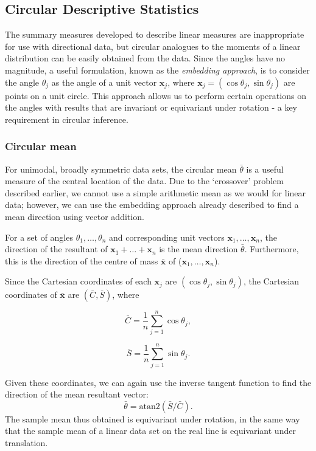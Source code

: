 \documentclass[../../ArchStats.tex]{subfiles}
\begin{document}
\subsection{Circular Descriptive Statistics}

The summary measures developed to describe linear measures are inappropriate for use with directional data, but circular analogues to the moments of a linear distribution can be easily obtained from the data. Since the angles have no magnitude, a useful formulation, known as the \textit{embedding approach}, is to consider the angle $\theta_j$ as the angle of a unit vector $\mathbf{x}_j$, where $\mathbf{x}_j = (\cos\theta_j, \sin\theta_j)$ are points on a unit circle. This approach allows us to perform certain operations on the angles with results that are invariant or equivariant under rotation - a key requirement in circular inference.


\subsubsection{Circular mean}

For unimodal, broadly symmetric data sets, the circular mean $\bar{\theta}$ is a useful measure of the central location of the data. Due to the `crossover' problem described earlier, we cannot use a simple arithmetic mean as we would for linear data; however, we can use the embedding approach already described to find a mean direction using vector addition. 

For a set of angles $\theta_1, \dots, \theta_n$ and corresponding unit vectors $\mathbf{x}_1, \dots, \mathbf{x}_n$, the direction of the resultant of $\mathbf{x}_1 + \dots + \mathbf{x}_n$ is the mean direction $\bar{\theta}$. Furthermore, this is the direction of the centre of mass $\mathbf{\bar{x}}$ of ($\mathbf{x}_1, \dots, \mathbf{x}_n$).

Since the Cartesian coordinates of each $\mathbf{x}_j$ are $(\cos\theta_j, \sin\theta_j)$, the Cartesian coordinates of $\mathbf{\bar{x}}$ are $(\bar{C}, \bar{S})$, where
	\begin{minipage}{0.5\linewidth}
	\[\bar{C} = \frac{1}{n} \sum_{j=1}^{n} \cos \theta_j,\]
	\end{minipage}
	\hspace{0.5cm}
	\begin{minipage}{0.5\linewidth}
	\[\bar{S} = \frac{1}{n} \sum_{j=1}^{n} \sin \theta_j.\]
	\end{minipage}
Given these coordinates, we can again use the inverse tangent function to find the direction of the mean resultant vector: 
\[\bar{\theta} = \text{atan2}(\bar{S}/\bar{C}).\]
 The sample mean thus obtained is equivariant under rotation, in the same way that the sample mean of a linear data set on the real line is equivariant under translation.
\end{document}
